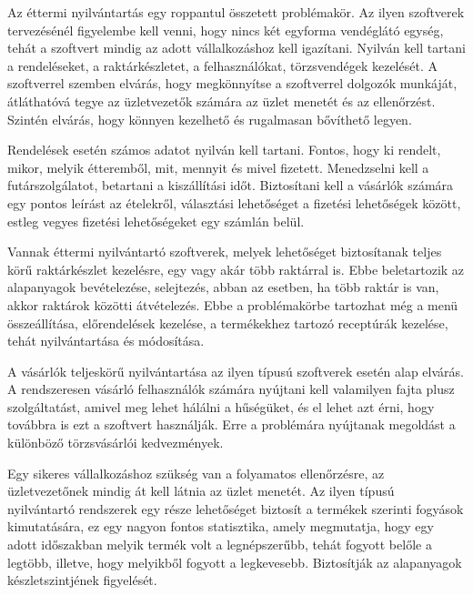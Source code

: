 
Az éttermi nyilvántartás egy roppantul összetett problémakör. Az ilyen szoftverek tervezésénél figyelembe kell venni, hogy nincs két egyforma vendéglátó egység, tehát a szoftvert mindig az adott vállalkozáshoz kell igazítani. Nyilván kell tartani a rendeléseket, a raktárkészletet, a felhasználókat, törzsvendégek kezelését. A szoftverrel szemben elvárás, hogy megkönnyítse a szoftverrel dolgozók munkáját, átláthatóvá tegye az üzletvezetők számára az üzlet menetét és az ellenőrzést. Szintén elvárás, hogy könnyen kezelhető és rugalmasan bővíthető legyen.


Rendelések esetén számos adatot nyilván kell tartani. Fontos, hogy ki rendelt, mikor, melyik étteremből, mit, mennyit és mivel fizetett. Menedzselni kell a futárszolgálatot, betartani a kiszállítási időt. Biztosítani kell a vásárlók számára egy pontos leírást az ételekről, választási lehetőséget a fizetési lehetőségek között, estleg vegyes fizetési lehetőségeket egy számlán belül.


Vannak éttermi nyilvántartó szoftverek, melyek lehetőséget biztosítanak teljes körű raktárkészlet kezelésre, egy vagy akár több raktárral is. Ebbe beletartozik az alapanyagok bevételezése, selejtezés, abban az esetben, ha több raktár is van, akkor raktárok közötti átvételezés.
Ebbe a problémakörbe tartozhat még a menü összeállítása, előrendelések kezelése, a termékekhez tartozó receptúrák kezelése, tehát nyilvántartása és módosítása.


A vásárlók teljeskörű nyilvántartása az ilyen típusú szoftverek esetén alap elvárás. A rendszeresen vásárló felhasználók számára nyújtani kell valamilyen fajta plusz szolgáltatást, amivel meg lehet hálálni a hűségüket, és el lehet azt érni, hogy továbbra is ezt a szoftvert használják. Erre a problémára nyújtanak megoldást a különböző törzsvásárlói kedvezmények.


Egy sikeres vállalkozáshoz szükség van a folyamatos ellenőrzésre, az üzletvezetőnek mindig át kell látnia az üzlet menetét. Az ilyen típusú nyilvántartó rendszerek egy része lehetőséget biztosít a termékek szerinti fogyások kimutatására, ez egy nagyon fontos statisztika, amely megmutatja, hogy egy adott időszakban melyik termék volt a legnépszerűbb, tehát fogyott belőle a legtöbb, illetve, hogy melyikből fogyott a legkevesebb. Biztosítják az alapanyagok készletszintjének figyelését.

